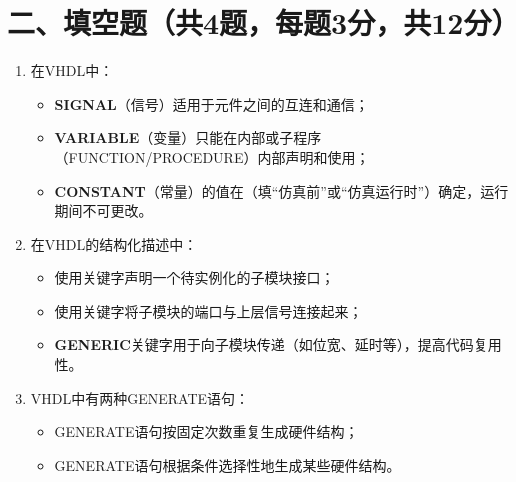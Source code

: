 \newpage

\section*{二、填空题（共4题，每题3分，共12分）}

\begin{enumerate}[label=\arabic*.]

\item 在VHDL中：
\begin{itemize}
  \item \textbf{SIGNAL}（信号）适用于元件之间的互连和\underline{\hspace{2.5cm}}通信；
  \item \textbf{VARIABLE}（变量）只能在\underline{\hspace{2.5cm}}内部或子程序（FUNCTION/PROCEDURE）内部声明和使用；
  \item \textbf{CONSTANT}（常量）的值在\underline{\hspace{2.5cm}}（填“仿真前”或“仿真运行时”）确定，运行期间不可更改。
\end{itemize}

\vspace{0.5cm}

\item 在VHDL的结构化描述中：
\begin{itemize}
  \item 使用关键字\underline{\hspace{2.5cm}}声明一个待实例化的子模块接口；
  \item 使用关键字\underline{\hspace{2.5cm}}将子模块的端口与上层信号连接起来；
  \item \textbf{GENERIC}关键字用于向子模块传递\underline{\hspace{2.5cm}}（如位宽、延时等），提高代码复用性。
\end{itemize}

\vspace{0.5cm}

\item VHDL中有两种GENERATE语句：
\begin{itemize}
  \item \underline{\hspace{3cm}} GENERATE语句按固定次数重复生成硬件结构；
  \item \underline{\hspace{3cm}} GENERATE语句根据条件选择性地生成某些硬件结构。
\end{itemize}


\end{enumerate}
